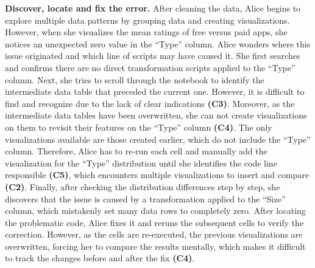 \textbf{Discover, locate and fix the error. } 
After cleaning the data, Alice begins to explore multiple data patterns by grouping data and creating visualizations. 
However, when she visualizes the mean ratings of free versus paid apps, she notices an unexpected zero value in the ``Type'' column. 
Alice wonders where this issue originated and which line of scripts may have caused it. 
She first searches and confirms there are no direct transformation scripts applied to the ``Type'' column. 
Next, she tries to scroll through the notebook to identify the intermediate data table that preceded the current one. 
However, it is difficult to find and recognize due to the lack of clear indications \textbf{(C3)}.
Moreover, as the intermediate data tables have been overwritten, she can not create visualizations on them to revisit their features on the ``Type'' column \textbf{(C4)}. 
The only visualizations available are those created earlier, which do not include the ``Type'' column. 
Therefore, Alice has to re-run each cell and manually add the visualization for the ``Type'' distribution until she identifies the code line responsible \textbf{(C5)}, which encounters multiple visualizations to insert and compare \textbf{(C2)}. 
Finally, after checking the distribution differences step by step, she discovers that the issue is caused by a transformation applied to the ``Size'' column, which mistakenly set many data rows to completely zero.
After locating the problematic code, Alice fixes it and reruns the subsequent cells to verify the correction. 
However, as the cells are re-executed, the previous visualizations are overwritten, forcing her to compare the results mentally, which makes it difficult to track the changes before and after the fix \textbf{(C4)}.

